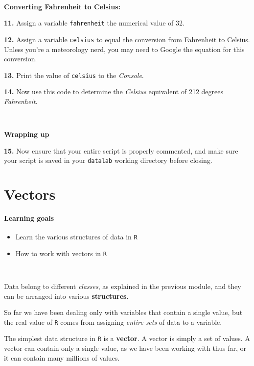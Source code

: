 \documentclass[
]{book}
\providecommand{\tightlist}{%
  \setlength{\itemsep}{0pt}\setlength{\parskip}{0pt}}
\begin{document}
~

\textbf{Converting Fahrenheit to Celsius:}

\textbf{11.} Assign a variable \texttt{fahrenheit} the numerical value of 32.

\textbf{12.} Assign a variable \texttt{celsius} to equal the conversion from Fahrenheit to Celsius. Unless you're a meteorology nerd, you may need to Google the equation for this conversion.

\textbf{13.} Print the value of \texttt{celsius} to the \emph{Console}.

\textbf{14.} Now use this code to determine the \emph{Celsius} equivalent of 212 degrees \emph{Fahrenheit}.

~

\textbf{Wrapping up}

\textbf{15.} Now ensure that your entire script is properly commented, and make sure your script is saved in your \texttt{datalab} working directory before closing.

\hypertarget{vectors}{%
\chapter{Vectors}\label{vectors}}

\hypertarget{learning-goals-4}{%
\subsubsection*{Learning goals}\label{learning-goals-4}}

\begin{itemize}
\tightlist
\item
  Learn the various structures of data in \texttt{R}\\
\item
  How to work with vectors in \texttt{R}
\end{itemize}

~

Data belong to different \emph{classes}, as explained in the previous module, and they can be arranged into various \textbf{structures}.

So far we have been dealing only with variables that contain a single value, but the real value of \texttt{R} comes from assigning \emph{entire sets} of data to a variable.

The simplest data structure in \texttt{R} is a \textbf{vector}. A vector is simply a set of values. A vector can contain only a single value, as we have been working with thus far, or it can contain many millions of values.
\end{document}
